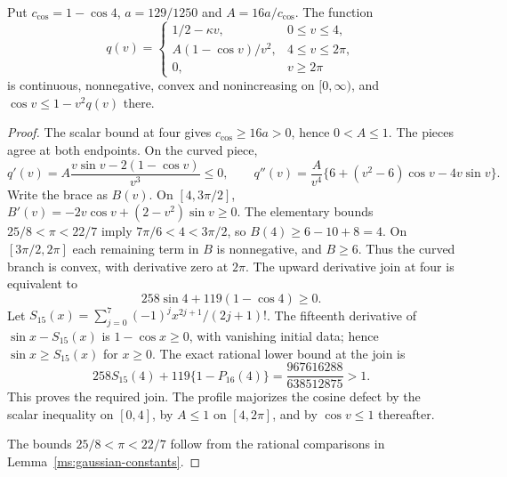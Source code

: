 \begin{lemma}\label{ms:fourier:afcore:lem:profile}
Put $c_{\cos}=1-\cos4$, $a=129/1250$ and $A=16a/c_{\cos}$. The function
\begin{equation}\label{ms:fourier:afcore:eq:profile}
 q(v)=\begin{cases}
  1/2-\kappa v,&0\le v\le4,\\
  A(1-\cos v)/v^2,&4\le v\le2\pi,\\
  0,&v\ge2\pi
 \end{cases}
\end{equation}
is continuous, nonnegative, convex and nonincreasing on $[0,\infty)$,
and $\cos v\le1-v^2q(v)$ there.
\end{lemma}
\begin{proof}
The scalar bound at four gives $c_{\cos}\ge16a>0$, hence $0<A\le1$.
The pieces agree at both endpoints. On the curved piece,
\[
 q'(v)=A\frac{v\sin v-2(1-\cos v)}{v^3}\le0,
 \qquad
 q''(v)=\frac{A}{v^4}
       \{6+(v^2-6)\cos v-4v\sin v\}.
\]
Write the brace as $B(v)$. On $[4,3\pi/2]$,
$B'(v)=-2v\cos v+(2-v^2)\sin v\ge0$.
The elementary bounds $25/8<\pi<22/7$ imply
$7\pi/6<4<3\pi/2$, so $B(4)\ge6-10+8=4$.
On $[3\pi/2,2\pi]$ each remaining term in $B$ is nonnegative,
and $B\ge6$. Thus the curved branch is convex, with derivative zero
at $2\pi$. The upward derivative join at four is equivalent to
\[
 258\sin4+119(1-\cos4)\ge0.
\]
Let $S_{15}(x)=\sum_{j=0}^7(-1)^jx^{2j+1}/(2j+1)!$.
The fifteenth derivative of $\sin x-S_{15}(x)$ is $1-\cos x\ge0$,
with vanishing initial data; hence $\sin x\ge S_{15}(x)$ for $x\ge0$.
The exact rational lower bound at the join is
\[
 258S_{15}(4)+119\{1-P_{16}(4)\}
 =\frac{967616288}{638512875}>1.
\]
This proves the required join. The profile majorizes the cosine defect
by the scalar inequality on $[0,4]$, by $A\le1$ on $[4,2\pi]$,
and by $\cos v\le1$ thereafter.

The bounds $25/8<\pi<22/7$ follow from the rational comparisons in
Lemma~\ref{ms:gaussian-constants}.
\end{proof}

